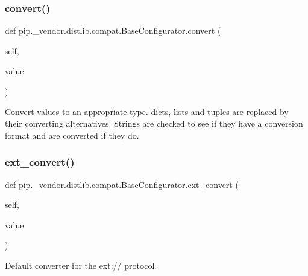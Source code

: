 \subsubsection{\texorpdfstring{convert()}{convert()}}
{\footnotesize\ttfamily def pip.\+\_\+vendor.\+distlib.\+compat.\+Base\+Configurator.\+convert (\begin{DoxyParamCaption}\item[{}]{self,  }\item[{}]{value }\end{DoxyParamCaption})}

\begin{DoxyVerb}Convert values to an appropriate type. dicts, lists and tuples are
replaced by their converting alternatives. Strings are checked to
see if they have a conversion format and are converted if they do.
\end{DoxyVerb}
 \mbox{\label{classpip_1_1__vendor_1_1distlib_1_1compat_1_1BaseConfigurator_a99583d9b1713e0e7ed6f5e6024f6146c}} 
\subsubsection{\texorpdfstring{ext\+\_\+convert()}{ext\_convert()}}
{\footnotesize\ttfamily def pip.\+\_\+vendor.\+distlib.\+compat.\+Base\+Configurator.\+ext\+\_\+convert (\begin{DoxyParamCaption}\item[{}]{self,  }\item[{}]{value }\end{DoxyParamCaption})}

\begin{DoxyVerb}Default converter for the ext:// protocol.\end{DoxyVerb}
 \mbox{\label{classpip_1_1__vendor_1_1distlib_1_1compat_1_1BaseConfigurator_a7ac14d003fbddaa51c132a99ea9ea309}} 
